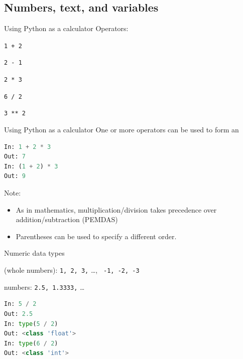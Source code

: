 \documentclass[aspectratio=169,usenames,dvipsnames]{beamer}
\begin{document}
\subsection{Numbers, text, and variables}
\frame{\tableofcontents[currentsubsection]}

\begin{frame}[fragile]{Using Python as a calculator}
Operators:
    \begin{description}[Exponentation]
        \item[Addition] \lstinline{1 + 2}
        \item[Subtraction] \lstinline{2 - 1}
        \item[Multiplication] \lstinline{2 * 3}
        \item[Division] \lstinline{6 / 2}
        \item[Exponentation] \lstinline{3 ** 2}
    \end{description}
\end{frame}

\begin{frame}[fragile]{Using Python as a calculator}
One or more operators can be used to form an 
\begin{lstlisting}[language=python]
In: 1 + 2 * 3
Out: 7
In: (1 + 2) * 3
Out: 9
\end{lstlisting}

\pause
Note:
    \begin{itemize}
        \item As in mathematics, multiplication/division takes precedence over
            addition/subtraction (PEMDAS)
        \item Parentheses can be used to specify a different order.
    \end{itemize}
\end{frame}

\begin{frame}[fragile]{Numeric data types}
    \begin{description}
        \item[Integers] (whole numbers): \lstinline{1, 2, 3,} \dots, \lstinline{ -1, -2, -3}
        \item[Floating point] numbers: \lstinline{2.5, 1.3333,} \dots
    \end{description}

\pause
\begin{lstlisting}[language=python]
In: 5 / 2
Out: 2.5
In: type(5 / 2)
Out: <class 'float'>
In: type(6 / 2)
Out: <class 'int'>
\end{lstlisting}
\end{frame}
\end{document}
